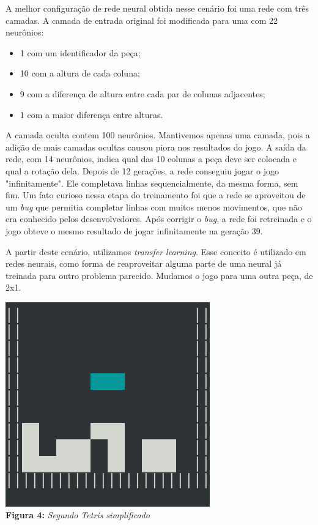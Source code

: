 \documentclass[conference]{IEEEtran}
\begin{document}
A melhor configuração de rede neural obtida nesse cenário foi uma rede com três camadas. A camada de entrada original foi modificada para uma com 22 neurônios:  

\begin{itemize}
\item 1 com um identificador da peça;
\item 10 com a altura de cada coluna;
\item 9 com a diferença de altura entre cada par de colunas adjacentes;
\item 1 com a maior diferença entre alturas.
\end{itemize}

A camada oculta contem 100 neurônios. Mantivemos apenas uma camada, pois a adição de mais camadas ocultas causou piora nos resultados do jogo. A saída da rede, com 14 neurônios, indica qual das 10 colunas a peça deve ser colocada e qual a rotação dela. Depois de 12 gerações, a rede conseguiu jogar o jogo "infinitamente". Ele completava linhas sequencialmente, da mesma forma, sem fim. Um fato curioso nessa etapa do treinamento foi que a rede se aproveitou de um \textit{bug} que permitia completar linhas com muitos menos movimentos, que não era conhecido pelos desenvolvedores. Após corrigir o \textit{bug}, a rede foi retreinada e o jogo obteve o mesmo resultado de jogar infinitamente na geração 39.

A partir deste cenário, utilizamos \textit{transfer learning}. Esse conceito é utilizado em redes neurais, como forma de reaproveitar alguma parte de uma neural já treinada para outro problema parecido. Mudamos o jogo para uma outra peça, de 2x1.

\begin{center}
\includegraphics[scale=0.3]{tetris_simples2.png}\\

\textbf{Figura 4:} \textit{Segundo Tetris simplificado}
\end{center}
\end{document}
